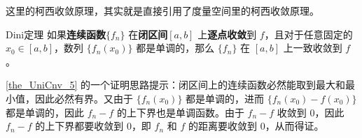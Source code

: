 这里的柯西收敛原理，其实就是直接引用了度量空间里的柯西收敛原理。

\begin{theorem}{Dini定理}\label{the_UniCnv_5}
如果\textbf{连续函数}$\{f_n\}$ 在\textbf{闭区间}$[a, b]$ 上\textbf{逐点收敛}到 $f$，且对于任意固定的 $x_0\in [a, b]$，数列 $\{f_n(x_0)\}$ 都是单调的，那么 $\{f_n\}$ 在 $[a, b]$ 上一致收敛到 $f$。
\end{theorem}

\autoref{the_UniCnv_5} 的一个证明思路提示：闭区间上的连续函数必然能取到最大和最小值，因此必然有界。又由于 $\{f_n(x_0)\}$ 都是单调的，进而 $\{f_n(x_0)-f(x_0)\}$ 都是单调的，因此 $f_n-f$ 的上下界也是单调函数。由于 $f_n-f$ 收敛到 $0$，因此 $f_n-f$ 的上下界都要收敛到 $0$，即 $f_n$ 和 $f$ 的距离要收敛到 $0$，从而得证。









